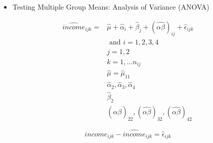 \documentclass[
  ignorenonframetext,
]{beamer}
\providecommand{\tightlist}{%
  \setlength{\itemsep}{0pt}\setlength{\parskip}{0pt}}\usepackage{longtable,booktabs,array}
\begin{document}
\begin{frame}{}
\label{section-33}
\begin{itemize}
\tightlist
\item
  Testing Multiple Group Means: Analysis of Variance (ANOVA)
\end{itemize}

\footnotesize

\[\begin{split}
  \widehat{income}_{ijk} =  & \widehat{\mu} + \widehat{\alpha}_i + \widehat{\beta}_j + (\widehat{\alpha\beta})_{ij} + \widehat{\epsilon}_{ijk} \\ 
  & \text{ and } i = 1, 2, 3, 4 \\
  & j = 1, 2 \\
  & k = 1, \ldots n_{ij} \\
  & \widehat{\mu} = \widehat{\mu}_{11} \\
  & \widehat{\alpha}_2, \widehat{\alpha}_3, \widehat{\alpha}_4 \\
  & \widehat{\beta}_2 \\ 
  & (\widehat{\alpha\beta})_{22}, (\widehat{\alpha\beta})_{32}, (\widehat{\alpha\beta})_{42}
  \end{split}\]

\[income_{ijk} - \widehat{income}_{ijk} = \widehat{\epsilon}_{ijk}\]
\end{frame}
\end{document}
